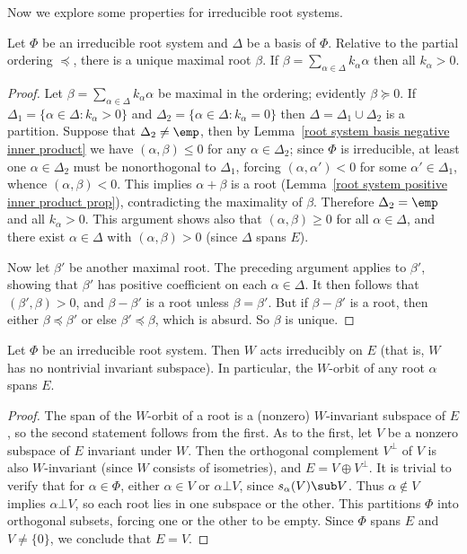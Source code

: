 Now we explore some properties for irreducible root systems.
\begin{proposition}\label{root system irreducible unique maximal root}
Let $\Phi$ be an irreducible root system and $\Delta$ be a basis of $\Phi$. Relative to the partial ordering $\preceq$, there is a unique maximal root $\beta$. If $\beta=\sum_{\alpha\in\Delta}k_\alpha\alpha$ then all $k_\alpha>0$.
\end{proposition}
\begin{proof}
Let $\beta=\sum_{\alpha\in\Delta}k_\alpha\alpha$ be maximal in the ordering; evidently $\beta\succeq 0$. If $\Delta_1=\{\alpha\in\Delta:k_\alpha>0\}$ and $\Delta_2=\{\alpha\in\Delta:k_\alpha=0\}$ then $\Delta=\Delta_1\cup\Delta_2$ is a partition. Suppose that $\Delta_2\neq\emp$, then by Lemma~\ref{root system basis negative inner product} we have $(\alpha,\beta)\leq 0$ for any $\alpha\in\Delta_2$; since $\Phi$ is irreducible, at least one $\alpha\in\Delta_2$ must be nonorthogonal to $\Delta_1$, forcing $(\alpha,\alpha')<0$ for some $\alpha'\in\Delta_1$, whence $(\alpha,\beta)<0$. This implies $\alpha+\beta$ is a root (Lemma~\ref{root system positive inner product prop}), contradicting the maximality of $\beta$. Therefore $\Delta_2=\emp$ and all $k_\alpha>0$. This argument shows also that $(\alpha,\beta)\geq 0$ for all $\alpha\in\Delta$, and there exist $\alpha\in\Delta$ with $(\alpha,\beta)>0$ (since $\Delta$ spans $E$).\par
Now let $\beta'$ be another maximal root. The preceding argument applies to $\beta'$, showing that $\beta'$ has positive coefficient on each $\alpha\in\Delta$. It then follows that $(\beta',\beta)>0$, and $\beta-\beta'$ is a root unless $\beta=\beta'$. But if $\beta-\beta'$ is a root, then either $\beta\preceq\beta'$ or else $\beta'\preceq\beta$, which is absurd. So $\beta$ is unique.
\end{proof}
\begin{proposition}\label{root system irreducible Weyl group acts irreducibly}
Let $\Phi$ be an irreducible root system. Then $W$ acts irreducibly on $E$ (that is, $W$ has no nontrivial invariant subspace). In particular, the $W$-orbit of any root $\alpha$ spans $E$.
\end{proposition}
\begin{proof}
The span of the $W$-orbit of a root is a (nonzero) $W$-invariant subspace of $E$, so the second statement follows from the first. As to the first, let $V$ be a nonzero subspace of $E$ invariant under $W$. Then the orthogonal complement $V^\bot$ of $V$ is also $W$-invariant (since $W$ consists of isometries), and $E=V\oplus V^\bot$. It is trivial to verify that for $\alpha\in\Phi$, either $\alpha\in V$ or $\alpha\bot V$, since $s_\alpha(V)\sub V$. Thus $\alpha\notin V$ implies $\alpha\bot V$, so each root lies in one subspace or the other. This partitions $\Phi$ into orthogonal subsets, forcing one or the other to be empty. Since $\Phi$ spans $E$ and $V\neq\{0\}$, we conclude that $E=V$.
\end{proof}
